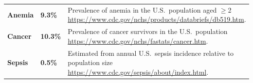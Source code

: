 \begin{table}[!htbp]
\begin{tabular}{p{3.6cm} p{2.2cm} p{7.8cm}}
\textbf{Anemia} & \textbf{9.3\%} &
Prevalence of anemia in the U.S.\ population aged $\geq$2 \url{https://www.cdc.gov/nchs/products/databriefs/db519.htm}. \\[5pt]

\textbf{Cancer} & \textbf{10.3\%} &
Prevalence of cancer survivors in the U.S.\ population \url{https://www.cdc.gov/nchs/fastats/cancer.htm}. \\[5pt]

\textbf{Sepsis} & \textbf{0.5\%} &
Estimated from annual U.S.\ sepsis incidence relative to population size \url{https://www.cdc.gov/sepsis/about/index.html}. \\

\bottomrule
\end{tabular}
\vspace{-3.5mm}
\end{table}
